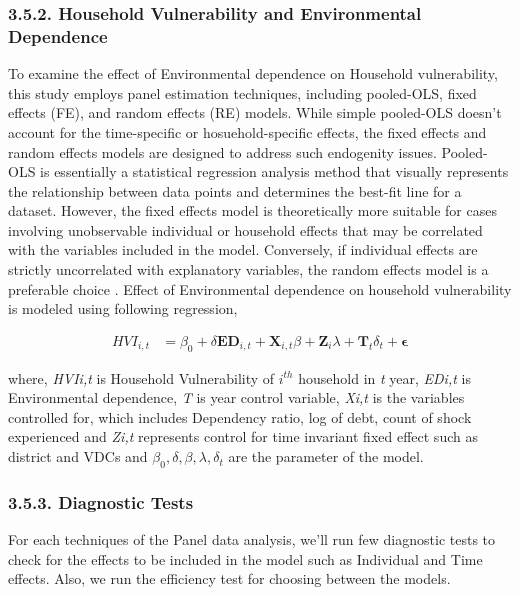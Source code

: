 \documentclass[12pt, a4paper]{article}
\begin{document}
\subsubsection{3.5.2. Household Vulnerability and Environmental Dependence}
\renewcommand{\thepage}{\arabic{page}}
To examine the effect of Environmental dependence on Household vulnerability, this study employs panel estimation techniques, including pooled-OLS, fixed effects (FE), and random effects (RE) models. While simple pooled-OLS doesn't account for the time-specific or hosuehold-specific effects, the fixed effects and random effects models are designed to address such endogenity issues. Pooled-OLS is essentially a statistical regression analysis method that visually represents the relationship between data points and determines the best-fit line for a dataset. However, the fixed effects model is theoretically more suitable for cases involving unobservable individual  or household effects that may be correlated with the variables included in the model. Conversely, if individual effects are strictly uncorrelated with explanatory variables, the random effects model is a preferable choice \citep{hsiao2022analysis}.   Effect of Environmental dependence on household vulnerability is modeled using
following regression,
\vspace{-\baselineskip}
\begin{center}
	\begin{align}
\mathit{HVI}_{i,t} &= \beta_{0} + \delta \mathit{\mathbf{ED}_{i,t}} + \mathbf{X}_{i,t} \beta + \mathbf{Z}_i \lambda + \mathbf{T}_t \delta_t + \boldsymbol{\epsilon}\tag{3.9}
\end{align}
\end{center}
where, \textit{HVIi,t} is Household Vulnerability of $i^{th}$ household in \textit{t} year, \textit{EDi,t} is Environmental dependence, \textit{T} is year control variable, \textit{Xi,t} is the variables controlled for, which includes Dependency ratio, log of debt, count of shock experienced and \textit{Zi,t} represents control for time invariant
fixed effect such as district and VDCs and $\beta_{0}, \delta, \beta, \lambda, \delta_t$ are the parameter of the model.

\subsubsection{3.5.3. Diagnostic Tests}
\renewcommand{\thepage}{\arabic{page}}
For each techniques of the Panel data analysis, we'll run few diagnostic tests to check for the effects to be included in the model such as Individual and Time effects. Also, we run the efficiency test for choosing between the models.
\end{document}
